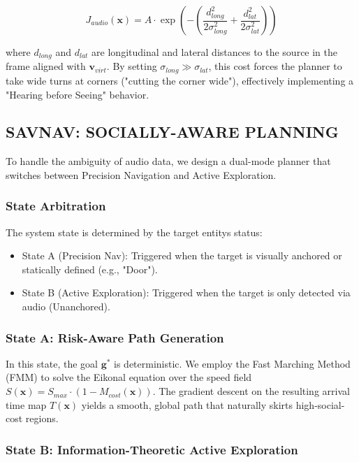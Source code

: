 \documentclass[
]{article}
\begin{document}
\[J_{audio}(\mathbf{x}) = A \cdot \exp \left( - \left( \frac{d_{long}^2}{2\sigma_{long}^2} + \frac{d_{lat}^2}{2\sigma_{lat}^2} \right) \right)\]

where \(d_{long}\) and \(d_{lat}\) are longitudinal and lateral
distances to the source in the frame aligned with \(\mathbf{v}_{virt}\).
By setting \(\sigma_{long} \gg \sigma_{lat}\), this cost forces the
planner to take wide turns at corners ("cutting the corner wide"),
effectively implementing a "Hearing before Seeing" behavior.

\subsection{SAVNAV: SOCIALLY-AWARE
PLANNING}\label{savnav-socially-aware-planning}

To handle the ambiguity of audio data, we design a dual-mode planner
that switches between Precision Navigation and Active Exploration.

\subsubsection{State Arbitration}\label{state-arbitration}

The system state is determined by the target entity\textquotesingle s
status:

\begin{itemize}
\item
  State A (Precision Nav): Triggered when the target is visually
  anchored or statically defined (e.g., "Door").
\item
  State B (Active Exploration): Triggered when the target is only
  detected via audio (Unanchored).
\end{itemize}

\subsubsection{State A: Risk-Aware Path
Generation}\label{state-a-risk-aware-path-generation}

In this state, the goal \(\mathbf{g}^*\) is deterministic. We employ the
Fast Marching Method (FMM) to solve the Eikonal equation over the speed
field \(S(\mathbf{x}) = S_{max} \cdot (1 - M_{cost}(\mathbf{x}))\). The
gradient descent on the resulting arrival time map \(T(\mathbf{x})\)
yields a smooth, global path that naturally skirts high-social-cost
regions.

\subsubsection{State B: Information-Theoretic Active
Exploration}\label{state-b-information-theoretic-active-exploration}
\end{document}
